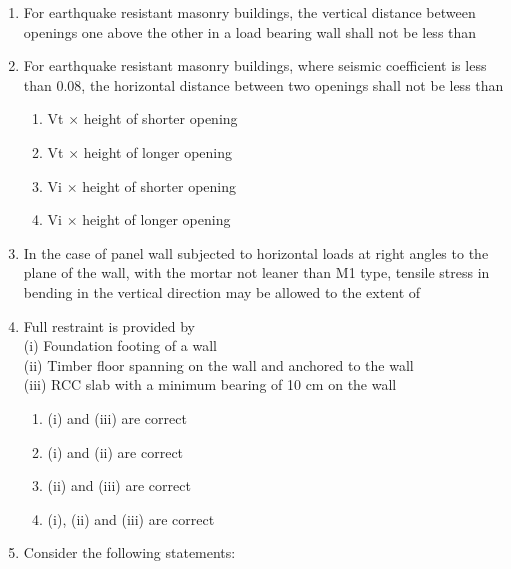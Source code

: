 \documentclass[11pt,a4paper]{article}
\begin{document}
\begin{enumerate}
\item{For earthquake resistant masonry buildings, the vertical distance between openings one above the other in a load bearing wall shall not be less than}
\\\begin{enumerate*}[itemjoin=\qquad, label=\Alph*.]
\item{50 cm}
\item{60 cm}
\item{75 cm}
\item{100 cm}
\end{enumerate*}
\item{For earthquake resistant masonry buildings, where seismic coefficient is less than 0.08, the horizontal distance between two openings shall not be less than}
\begin{enumerate}[label=\Alph*.]
\item{Vt $\times$ height of shorter opening}
\item{Vt $\times$ height of longer opening}
\item{Vi $\times$ height of shorter opening}
\item{Vi $\times$ height of longer opening}
\end{enumerate}
\item{In the case of panel wall subjected to horizontal loads at right angles to the plane of the wall, with the mortar not leaner than M1 type, tensile stress in bending in the vertical direction may be allowed to the extent of}
\\
\item{Full restraint is provided by \\
(i) Foundation footing of a wall \\
(ii) Timber floor spanning on the wall and anchored to the wall \\
(iii) RCC slab with a minimum bearing of 10 cm on the wall}
\begin{enumerate}[label=\Alph*.]
\item{(i) and (iii) are correct}
\item{(i) and (ii) are correct}
\item{(ii) and (iii) are correct}
\item{(i), (ii) and (iii) are correct}
\end{enumerate}
\item{Consider the following statements: \\

}
\end{enumerate}
\end{document}
